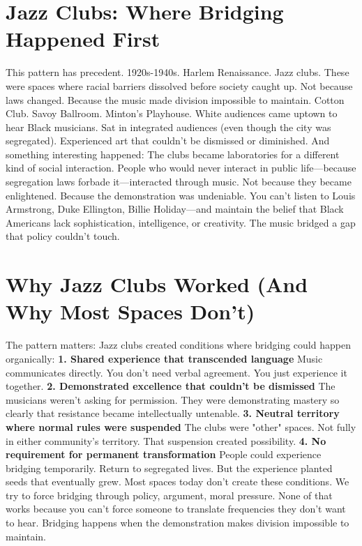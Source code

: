 \section{Jazz Clubs: Where Bridging Happened First}

This pattern has precedent.
1920s-1940s. Harlem Renaissance. Jazz clubs.
These were spaces where racial barriers dissolved before society caught up. Not because laws changed. Because the music made division impossible to maintain.
Cotton Club. Savoy Ballroom. Minton's Playhouse.
White audiences came uptown to hear Black musicians. Sat in integrated audiences (even though the city was segregated). Experienced art that couldn't be dismissed or diminished.
And something interesting happened:
The clubs became laboratories for a different kind of social interaction. People who would never interact in public life—because segregation laws forbade it—interacted through music.
Not because they became enlightened. Because the demonstration was undeniable.
You can't listen to Louis Armstrong, Duke Ellington, Billie Holiday—and maintain the belief that Black Americans lack sophistication, intelligence, or creativity.
The music bridged a gap that policy couldn't touch.

\section{Why Jazz Clubs Worked (And Why Most Spaces Don't)}

The pattern matters:
Jazz clubs created conditions where bridging could happen organically:
\textbf{1. Shared experience that transcended language}
Music communicates directly. You don't need verbal agreement. You just experience it together.
\textbf{2. Demonstrated excellence that couldn't be dismissed}
The musicians weren't asking for permission. They were demonstrating mastery so clearly that resistance became intellectually untenable.
\textbf{3. Neutral territory where normal rules were suspended}
The clubs were "other" spaces. Not fully in either community's territory. That suspension created possibility.
\textbf{4. No requirement for permanent transformation}
People could experience bridging temporarily. Return to segregated lives. But the experience planted seeds that eventually grew.
Most spaces today don't create these conditions.
We try to force bridging through policy, argument, moral pressure. None of that works because you can't force someone to translate frequencies they don't want to hear.
Bridging happens when the demonstration makes division impossible to maintain.

